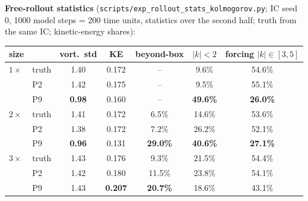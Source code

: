 \documentclass[11pt]{article}
\begin{document}
\textbf{Free-rollout statistics} (\texttt{scripts/exp\_rollout\_stats\_kolmogorov.py};
IC seed 0, 1000 model steps = 200 time units, statistics over the second
half; truth from the same IC; kinetic-energy shares):
\begin{center}
\small
\begin{tabular}{llccccc}
\toprule
size & & vort.\ std & KE & beyond-box & $|k|<2$ & forcing $|k|\in[3,5]$ \\
\midrule
$1\times$ & truth & 1.40 & 0.172 & -- & 9.6\% & 54.6\% \\
 & P2 & 1.42 & 0.175 & -- & 9.5\% & 55.1\% \\
 & P9 & \textbf{0.98} & 0.160 & -- & \textbf{49.6\%} & \textbf{26.0\%} \\
\midrule
$2\times$ & truth & 1.41 & 0.172 & 6.5\% & 14.6\% & 53.6\% \\
 & P2 & 1.38 & 0.172 & 7.2\% & 26.2\% & 52.1\% \\
 & P9 & \textbf{0.96} & 0.131 & \textbf{29.0\%} & \textbf{40.6\%} & \textbf{27.1\%} \\
\midrule
$3\times$ & truth & 1.43 & 0.176 & 9.3\% & 21.5\% & 54.4\% \\
 & P2 & 1.42 & 0.180 & 11.5\% & 23.8\% & 54.1\% \\
 & P9 & 1.43 & \textbf{0.207} & \textbf{20.7\%} & 18.6\% & 43.1\% \\
\bottomrule
\end{tabular}
\end{center}
\end{document}
